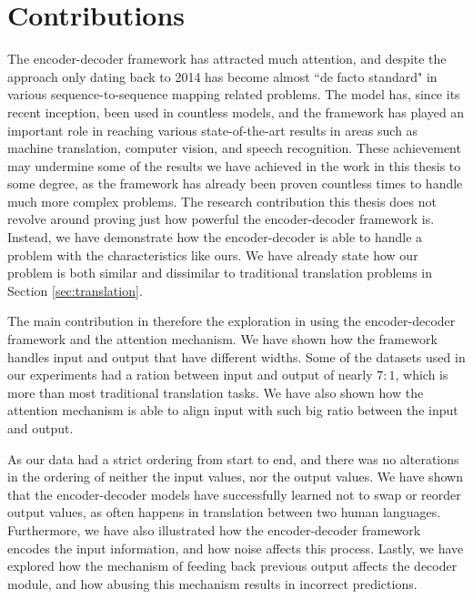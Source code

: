 
\section{Contributions}
\label{sec:contributions_final}

The encoder-decoder framework has attracted much attention, and despite the approach only dating back to 2014 has become almost ``de facto standard" in various sequence-to-sequence mapping related problems. The model has, since its recent inception, been used in countless models, and the framework has played an important role in reaching various state-of-the-art results in areas such as machine translation, computer vision, and speech recognition. These achievement may undermine some of the results we have achieved in the work in this thesis to some degree, as the framework has already been proven countless times to handle much more complex problems. The research contribution this thesis does not revolve around proving just how powerful the encoder-decoder framework is. Instead, we have demonstrate how the encoder-decoder is able to handle a problem with the characteristics like ours. We have already state how our problem is both similar and dissimilar to traditional translation problems in Section \ref{sec:translation}.

The main contribution in therefore the exploration in using the encoder-decoder framework and the attention mechanism. We have shown how the framework handles input and output that have different widths. Some of the datasets used in our experiments had a ration between input and output of nearly \(7 : 1\), which is more than most traditional translation tasks. We have also shown how the attention mechanism is able to align input with such big ratio between the input and output. 

As our data had a strict ordering from start to end, and there was no alterations in the ordering of neither the input values, nor the output values. We have shown that the encoder-decoder models have successfully learned not to swap or reorder output values, as often happens in translation between two human languages. Furthermore, we have also illustrated how the encoder-decoder framework encodes the input information, and how noise affects this process. Lastly, we have explored how the mechanism of feeding back previous output affects the decoder module, and how abusing this mechanism results in incorrect predictions.

